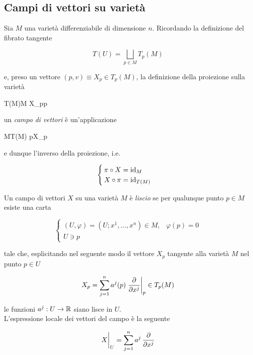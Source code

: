 \subsection{Campi di vettori su varietà}

Sia $ M $ una varietà differenziabile di dimensione $ n $. Ricordando la definizione del fibrato tangente

\begin{equation}
	T(U) = \bigsqcup_{p \in M} T_{p}(M)
\end{equation}

e, preso un vettore $ (p,v) \equiv X_{p} \in T_{p}(M) $, la definizione della proiezione sulla varietà

\map{\pi}
	{T(M)}{M}
	{X_{p}}{p}

un \textit{campo di vettori} è un'applicazione

	{M}{T(M)}
	{p}{X_{p}}

e dunque l'inverso della proiezione, i.e.

\begin{equation}
	\begin{cases}
		\pi \circ X = \operatorname{id}_{M} \\
		X \circ \pi = \operatorname{id}_{T(M)}
	\end{cases}
\end{equation}

Un campo di vettori $ X $ su una varietà $ M $ è \textit{liscio} se per qualunque punto $ p \in M $ esiste una carta

\begin{equation}
	\begin{cases}
		(U,\varphi) = (U; x^{1},\dots,x^{n}) \in M, & \varphi(p) = 0 \\
		U \ni p
	\end{cases}
\end{equation}

tale che, esplicitando nel seguente modo il vettore $ X_{p} $ tangente alla varietà $ M $ nel punto $ p \in U $

\begin{equation}
	X_{p} = \sum_{j=1}^{n} a^{j}(p) \eval{ \pdv{x^{j}} }_{p} \in T_{p}(M)
\end{equation}

le funzioni $ a^{j} : U \to \mathbb{R} $ siano lisce in $ U $. \\
L'espressione locale dei vettori del campo è la seguente

\begin{equation}
	\eval{X}_{U} = \sum_{j=1}^{n} a^{j} \, \pdv{x^{j}}
\end{equation}

